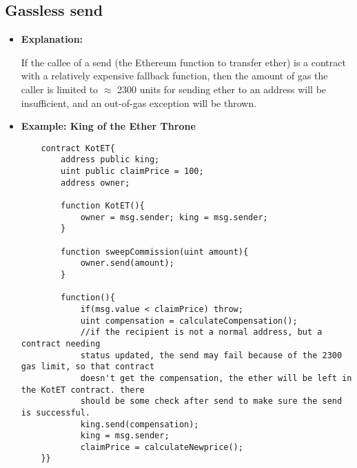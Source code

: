 \documentclass{llncs}
\begin{document}
\subsection{Gassless send}
\begin{itemize}
\item \textbf{Explanation:} 

If the callee of a send (the Ethereum function to transfer ether) is a contract with a relatively expensive fallback function, then the amount of gas the caller is limited to $ \approx $ 2300 units for sending ether to an address will be insufficient, and an out-of-gas exception will be thrown.

\item \textbf{Example: King of the Ether Throne}

	\begin{minipage}{.5\textwidth} 
	{\scriptsize
	\begin{verbatim}
	contract KotET{
	    address public king;
	    uint public claimPrice = 100;
	    address owner;
	    
	    function KotET(){
	        owner = msg.sender; king = msg.sender;
	    }
	    
	    function sweepCommission(uint amount){
	        owner.send(amount);
	    }
	    
	    function(){
	        if(msg.value < claimPrice) throw;
	        uint compensation = calculateCompensation();
	        //if the recipient is not a normal address, but a contract needing 
	        status updated, the send may fail because of the 2300 gas limit, so that contract
	        doesn't get the compensation, the ether will be left in the KotET contract. there
	        should be some check after send to make sure the send is successful.  
	        king.send(compensation);
	        king = msg.sender;
	        claimPrice = calculateNewprice();
	}}
	\end{verbatim} }
	
	\end{minipage}

\end{itemize}
\end{document}
